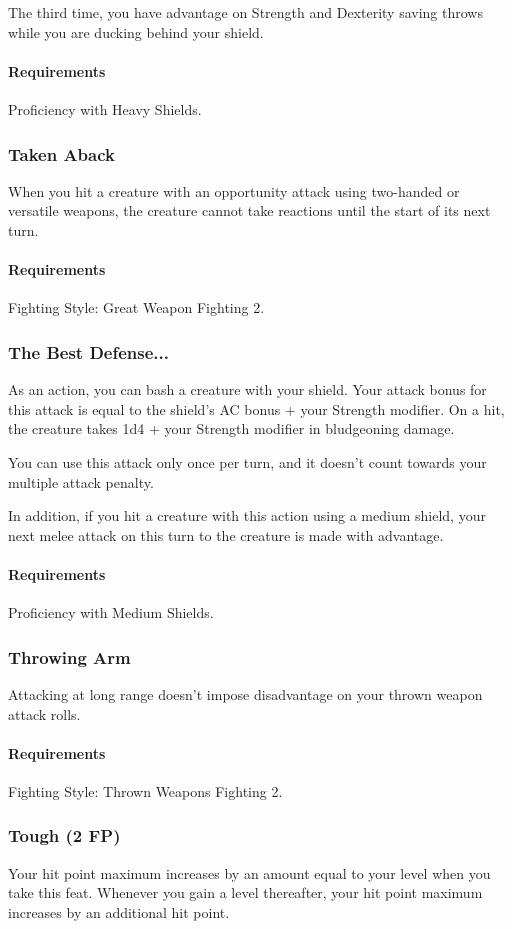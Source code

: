    The third time, you have advantage on Strength and Dexterity saving throws while you are ducking behind your shield.
    \paragraph{Requirements} Proficiency with Heavy Shields.
\subsubsection{Taken Aback} \label{feat::takenaback}
    When you hit a creature with an opportunity attack using two-handed or versatile weapons, the creature cannot take reactions until the start of its next turn.
    \paragraph{Requirements} Fighting Style: Great Weapon Fighting 2.
\subsubsection{The Best Defense...} \label{feat::thebestdefense}
    As an action, you can bash a creature with your shield.
    Your attack bonus for this attack is equal to the shield's AC bonus + your Strength modifier.
    On a hit, the creature takes 1d4 + your Strength modifier in bludgeoning damage.

    You can use this attack only once per turn, and it doesn't count towards your multiple attack penalty.

    In addition, if you hit a creature with this action using a medium shield, your next melee attack on this turn to the creature is made with advantage.
    \paragraph{Requirements} Proficiency with Medium Shields.
\subsubsection{Throwing Arm} \label{feat::throwingarm}
    Attacking at long range doesn't impose disadvantage on your thrown weapon attack rolls.
    \paragraph{Requirements} Fighting Style: Thrown Weapons Fighting 2.
\subsubsection{Tough (2 FP)} \label{feat::tough}
    Your hit point maximum increases by an amount equal to your level when you take this feat.
    Whenever you gain a level thereafter, your hit point maximum increases by an additional hit point.
